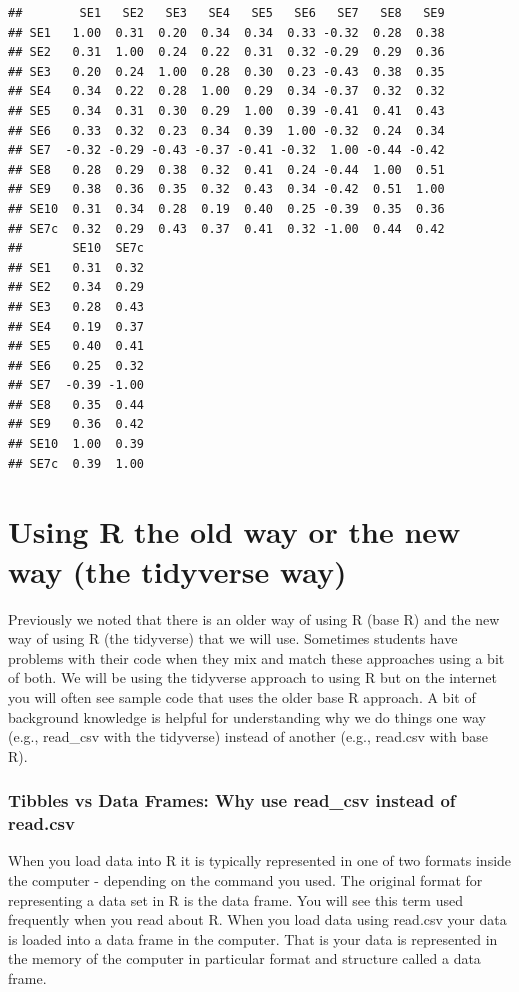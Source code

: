 \documentclass[
]{krantz}
\begin{document}
\begin{verbatim}
##        SE1   SE2   SE3   SE4   SE5   SE6   SE7   SE8   SE9
## SE1   1.00  0.31  0.20  0.34  0.34  0.33 -0.32  0.28  0.38
## SE2   0.31  1.00  0.24  0.22  0.31  0.32 -0.29  0.29  0.36
## SE3   0.20  0.24  1.00  0.28  0.30  0.23 -0.43  0.38  0.35
## SE4   0.34  0.22  0.28  1.00  0.29  0.34 -0.37  0.32  0.32
## SE5   0.34  0.31  0.30  0.29  1.00  0.39 -0.41  0.41  0.43
## SE6   0.33  0.32  0.23  0.34  0.39  1.00 -0.32  0.24  0.34
## SE7  -0.32 -0.29 -0.43 -0.37 -0.41 -0.32  1.00 -0.44 -0.42
## SE8   0.28  0.29  0.38  0.32  0.41  0.24 -0.44  1.00  0.51
## SE9   0.38  0.36  0.35  0.32  0.43  0.34 -0.42  0.51  1.00
## SE10  0.31  0.34  0.28  0.19  0.40  0.25 -0.39  0.35  0.36
## SE7c  0.32  0.29  0.43  0.37  0.41  0.32 -1.00  0.44  0.42
##       SE10  SE7c
## SE1   0.31  0.32
## SE2   0.34  0.29
## SE3   0.28  0.43
## SE4   0.19  0.37
## SE5   0.40  0.41
## SE6   0.25  0.32
## SE7  -0.39 -1.00
## SE8   0.35  0.44
## SE9   0.36  0.42
## SE10  1.00  0.39
## SE7c  0.39  1.00
\end{verbatim}

\hypertarget{using-r-the-old-way-or-the-new-way-the-tidyverse-way}{%
\section{Using R the old way or the new way (the tidyverse way)}\label{using-r-the-old-way-or-the-new-way-the-tidyverse-way}}

Previously we noted that there is an older way of using R (base R) and the new way of using R (the tidyverse) that we will use. Sometimes students have problems with their code when they mix and match these approaches using a bit of both. We will be using the tidyverse approach to using R but on the internet you will often see sample code that uses the older base R approach. A bit of background knowledge is helpful for understanding why we do things one way (e.g., read\_csv with the tidyverse) instead of another (e.g., read.csv with base R).

\hypertarget{tibbles-vs-data-frames-why-use-read_csv-instead-of-read.csv}{%
\subsubsection{Tibbles vs Data Frames: Why use read\_csv instead of read.csv}\label{tibbles-vs-data-frames-why-use-read_csv-instead-of-read.csv}}

When you load data into R it is typically represented in one of two formats inside the computer - depending on the command you used. The original format for representing a data set in R is the data frame. You will see this term used frequently when you read about R. When you load data using read.csv your data is loaded into a data frame in the computer. That is your data is represented in the memory of the computer in particular format and structure called a data frame.
\end{document}
